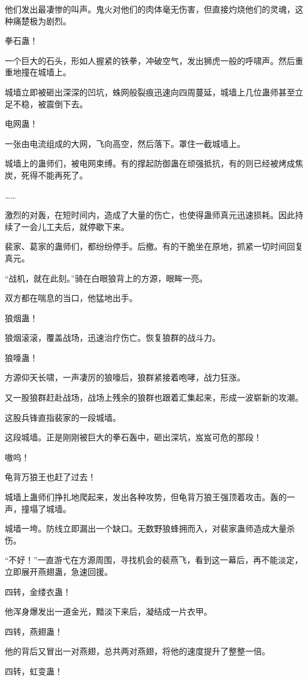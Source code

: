 \begin{this_body}
他们发出最凄惨的叫声。鬼火对他们的肉体毫无伤害，但直接灼烧他们的灵魂，这种痛楚极为剧烈。

拳石蛊！

一个巨大的石头，形如人握紧的铁拳，冲破空气，发出狮虎一般的呼啸声。然后重重地撞在城墙上。

城墙立即被砸出深深的凹坑，蛛网般裂痕迅速向四周蔓延，城墙上几位蛊师甚至立足不稳，被震倒下去。

电网蛊！

一张由电流组成的大网，飞向高空，然后落下。罩住一截城墙上。

城墙上的蛊师们，被电网束缚。有的撑起防御蛊在顽强抵抗，有的则已经被烤成焦炭，死得不能再死了。

……

激烈的对轰，在短时间内，造成了大量的伤亡，也使得蛊师真元迅速损耗。因此持续了一会儿工夫后，就停歇下来。

裴家、葛家的蛊师们，都纷纷停手。后撤。有的干脆坐在原地，抓紧一切时间回复真元。

“战机，就在此刻。”骑在白眼狼背上的方源，眼眸一亮。

双方都在喘息的当口，他猛地出手。

狼烟蛊！

狼烟滚滚，覆盖战场，迅速治疗伤亡。恢复狼群的战斗力。

狼嚎蛊！

方源仰天长啸，一声凄厉的狼嚎后，狼群紧接着咆哮，战力狂涨。

又一股狼群赶赴战场，战场上残余的狼群也跟着汇集起来，形成一波崭新的攻潮。

这股兵锋直指裴家的一段城墙。

这段城墙。正是刚刚被巨大的拳石轰中，砸出深坑，岌岌可危的那段！

嗷呜！

龟背万狼王也赶了过去！

城墙上蛊师们挣扎地爬起来，发出各种攻势，但龟背万狼王强顶着攻击。轰的一声，撞塌了城墙。

城墙一垮。防线立即漏出一个缺口。无数野狼蜂拥而入，对裴家蛊师造成大量杀伤。

“不好！”一直游弋在方源周围，寻找机会的裴燕飞，看到这一幕后，再不能淡定，立即展开燕翅蛊，急速回援。

四转，金缕衣蛊！

他浑身爆发出一道金光，黯淡下来后，凝结成一片衣甲。

四转，燕翅蛊！

他的背后又冒出一对燕翅，总共两对燕翅，将他的速度提升了整整一倍。

四转，虹变蛊！


\end{this_body}
